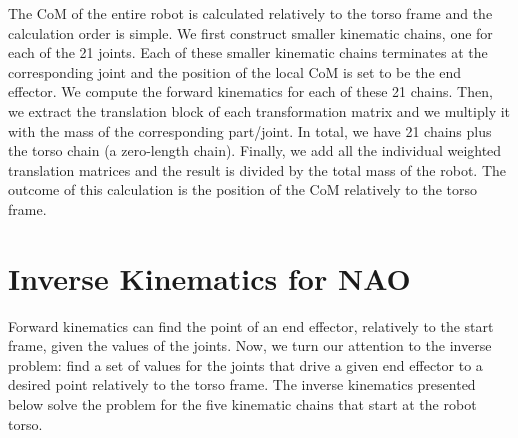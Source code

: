 The CoM of the entire robot is calculated relatively to the torso frame and the calculation order is simple. We first construct smaller kinematic chains, one for each of the 21 joints. Each of these smaller kinematic chains terminates at the corresponding joint and the position of the local CoM is set to be the end effector. We compute the forward kinematics for each of these 21 chains. Then, we extract the translation block of each transformation matrix and we multiply it with the mass of the corresponding part/joint. In total, we have 21 chains plus the torso chain (a zero-length chain). Finally, we add all the individual weighted translation matrices and the result is divided by the total mass of the robot. The outcome of this calculation is the position of the CoM relatively to the torso frame.











\section{Inverse Kinematics for NAO}


Forward kinematics can find the point of an end effector, relatively to the start frame, given the values of the joints. Now, we turn our attention to the inverse problem: find a set of values for the joints that drive a given end effector to a desired point relatively to the torso frame. The inverse kinematics presented below solve the problem for the five kinematic chains that start at the robot torso.

